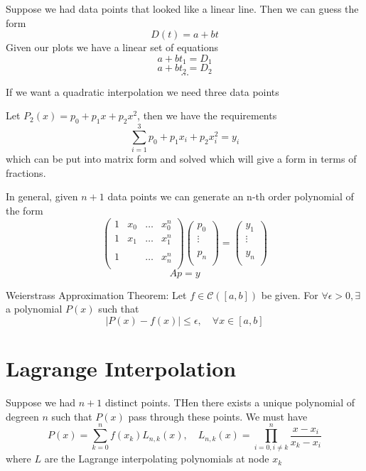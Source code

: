 \begin{eg}
Suppose we had data points that looked like a linear line. Then we can guess the form
\[
    D(t) = a+ bt
\]
Given our plots we have a linear set of equations
\[
    a+ bt_1 = D_1 
\]
\[
    a+ bt_2 = D_2
\]
\[
    \dots 
\]
\end{eg}
\begin{eg}
If we want a quadratic interpolation we need three data points

Let \(P_2(x) = p_0 + p_1 x + p_2 x^{2} \), then we have the requirements 
\[
    \sum_{i=1}^3 p_0 +p_1 x_i + p_2 x_{i}^{2} = y_i  
\]
which can be put into matrix form and solved which will give a form in terms of fractions. 
\end{eg}
In general, given \(n+1\) data points we can generate an n-th order polynomial of the form 
\[
    \begin{pmatrix}
        1 &  x_0& \dots   &   x_0^n\\
         1&  x_1&  \dots &  x_1^n \\
         &  &  &   \\
         1&  &\dots   & x_n^n   \\
    \end{pmatrix} 
    \begin{pmatrix}
         p_0 \\
         \vdots \\
          \\
         p_n \\
    \end{pmatrix}
    = \begin{pmatrix}
         y_1 \\
          \vdots \\
          \\
          y_n \\
    \end{pmatrix}
\] 
\[
    Ap = y
\]
\begin{theorem}
    Weierstrass Approximation Theorem:
    Let \(f \in \mathcal{C} ([a,b])\) be given. For \(\forall \epsilon  > 0, \exists\) a polynomial \(P(x)\)  such that 
    \[
        \vert P(x) - f(x)  \vert \leq \epsilon , \quad \forall x \in [a,b]
    \]
\end{theorem}

\section{Lagrange Interpolation}
\begin{theorem}
    Suppose we had \(n+1\) distinct points. THen there exists a unique polynomial of degreen \(n\)  such that 
    \(P(x)\)  pass through these points. We must have 
    \[
        P(x) = \sum_{k=0}^n f(x_k) L_{n,k} (x), \quad L_{n,k}(x) = \prod_{i=0, i\neq k}^n \frac{x-x_i}{x_k - x_i} 
    \]
    where \(L\)  are the Lagrange interpolating polynomials at node \(x_k \) 
\end{theorem}

